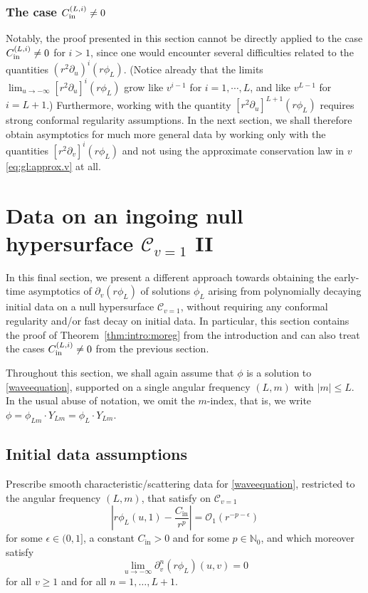\documentclass[11pt,english]{article}
\numberwithin{equation}{section}
\theoremstyle{remark}
\theoremstyle{plain}
\theoremstyle{remark}
\newcommand{\pu}{\partial_u}
\newcommand{\pv}{\partial_v}
\renewcommand{\(}{\left(}
\renewcommand{\)}{\right)}
\begin{document}
\subsubsection{The case \texorpdfstring{$C_{\mathrm{in}}^{(L,i)}\neq 0$}{Cin(L,i) neq 0}}
Notably, the proof presented in this section cannot be directly applied  to the case $C_{\mathrm{in}}^{(L,i)}\neq 0$ for $i>1$, since one would encounter several difficulties related to the quantities $(r^2\pu)^i(r\phi_L)$. (Notice already that the limits
$
\lim_{u\to-\infty}[r^2\pu]^{i}(r\phi_L)
$
grow like $v^{i-1}$ for $i=1,\cdots, L$, and like $v^{L-1}$ for $i=L+1$.) Furthermore, working with the quantity $[r^2\pu]^{L+1}(r\phi_L)$ requires strong conformal regularity assumptions.
 In the next section, we shall therefore obtain asymptotics for much more general data by working only with the quantities $[r^2\pv]^i(r\phi_L)$ and not using the approximate conservation law in $v$ \eqref{eq:gl:approx.v} at all.


\newpage
\section{Data on an ingoing null hypersurface \texorpdfstring{$\mathcal C_{v=1}$}{C(v=1)} II}\label{sec:moreg:null}
In this final section, we present a different approach towards obtaining the early-time asymptotics of $\pv(r\phi_L)$ of solutions $\phi_L$ arising from polynomially decaying initial data on a null hypersurface $\mathcal C_{v=1}$, without requiring any conformal regularity and/or fast decay on initial data.
 In particular, this section contains the proof of Theorem~\ref{thm:intro:moreg} from the introduction and can also treat the cases $C_{\mathrm{in}}^{(L,i)}\neq 0$ from the previous section.

Throughout this section, we shall again assume that $\phi$ is a solution to \eqref{waveequation}, supported on a single angular frequency $(L,m)$ with $|m|\leq L$. 
In the usual abuse of notation, we omit the $m$-index, that is, we write $\phi=\phi_{Lm}\cdot Y_{Lm}=\phi_L\cdot  Y_{Lm}$.


\subsection{Initial data assumptions}\label{sec:mg:ass}
\newcommand{\ci}{C_{\mathrm{in}}}
Prescribe smooth characteristic/scattering data for \eqref{waveequation}, restricted to the angular frequency $(L,m)$,  that satisfy on $\mathcal C_{v=1}$
\begin{equation}\label{eq:mg:ass1}
\left|r\phi_L(u,1)-\frac{\ci}{r^p}\right|=\mathcal O_1( r^{-p-\epsilon})
\end{equation}
for some $\epsilon\in(0,1]$, a constant $\ci>0$ and for some $p\in\mathbb N_0$, and which moreover satisfy 
\begin{equation}\label{eq:mg:assNoIncoming}
\lim_{u\to-\infty}\pv^n(r\phi_L)(u,v)=0
\end{equation}
for all $v\geq 1$ and for all $n=1,\dots, L+1$.
\end{document}
